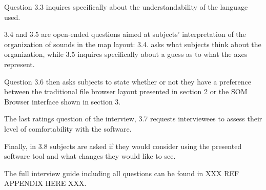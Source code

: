 \par
Question 3.3 inquires specifically about the understandability of the
language used.

\par
3.4 and 3.5 are open-ended questions aimed at subjects'
interpretation of the organization of sounds in the map layout: 3.4. asks what
subjects think about the organization, while 3.5 inquires specifically about
a guess as to what the axes represent.

\par
Question 3.6 then asks subjects to state whether or not they have a preference
between the traditional file browser layout presented in section 2 or the SOM
Browser interface shown in section 3.

\par
The last ratings question of the interview, 3.7 requests interviewees to assess
their level of comfortability with the software.

\par
Finally, in 3.8 subjects are asked if they would consider using the presented
software tool and what changes they would like to see.

\bigskip

The full interview guide including all questions can be found in
XXX REF APPENDIX HERE XXX.
